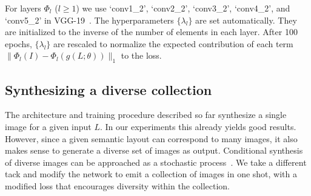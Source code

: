 
For layers $\Phi_l$ ($l\! \ge\! 1$) we use `conv1\_2', `conv2\_2', `conv3\_2', `conv4\_2', and `conv5\_2' in VGG-19~\cite{SimonyanZisserman2015}. The hyperparameters $\{\lambda_l\}$ are set automatically. They are initialized to the inverse of the number of elements in each layer. After 100 epochs, $\{\lambda_l\}$ are rescaled to normalize the expected contribution of each term ${\| \Phi_l(I)-\Phi_l(g(L;\theta))\|_1}$ to the loss.




\subsection{Synthesizing a diverse collection}
\label{sec:diversity}

The architecture and training procedure described so far synthesize a single image for a given input $L$. In our experiments this already yields good results.
However, since a given semantic layout can correspond to many images, it also makes sense to generate a diverse set of images as output.
Conditional synthesis of diverse images can be approached as a stochastic process~\cite{Nguyen2017}. We take a different tack and modify the network to emit a collection of images in one shot, with a modified loss that encourages diversity within the collection.

